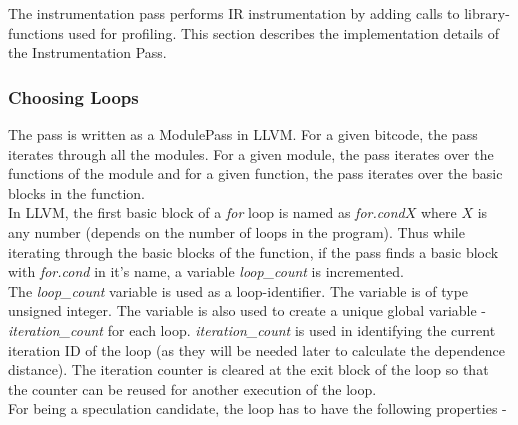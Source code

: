 \documentclass[10pt]{report}          %
\begin{document}
The instrumentation pass performs IR instrumentation by adding calls to library-functions used for profiling.  This section describes the implementation details of the Instrumentation Pass.

\subsubsection{Choosing Loops}

The pass is written as a ModulePass in LLVM.  For a given bitcode, the pass iterates through all the modules.  For a given module, the pass iterates over the functions of the module and for a given function, the pass iterates over the basic blocks in the function. \\

In LLVM, the first basic block of a \textit{for} loop is named as \textit{for.cond$X$} where $X$ is any number (depends on the number of loops in the program).  Thus while iterating through the basic blocks of the function, if the pass finds a basic block with \textit{for.cond} in it's name, a variable \textit{loop\_count} is incremented. \\

The \textit{loop\_count} variable is used as a loop-identifier.  The variable is of type unsigned integer.  The variable is also used to create a unique global variable - \textit{iteration\_count} for each loop.  \textit{iteration\_count} is used in identifying the current iteration ID of the loop (as they will be needed later to calculate the dependence distance).  The iteration counter is cleared at the exit block of the loop so that the counter can be reused for another execution of the loop. \\

For being a speculation candidate, the loop has to have the following properties -
\end{document}
